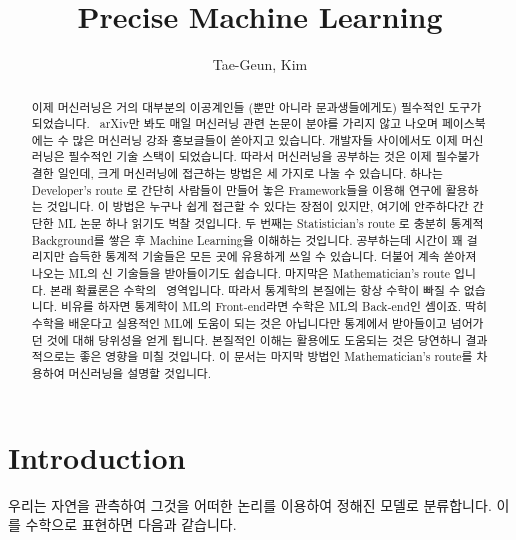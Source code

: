 \documentclass[final]{IEEEphot}
\begin{document}
\title{Precise Machine Learning}

\author{Tae-Geun, Kim}


\maketitle


\begin{abstract}
    이제 머신러닝은 거의 대부분의 이공계인들 (뿐만 아니라 문과생들에게도) 필수적인 도구가 되었습니다. 
    arXiv만 봐도 매일 머신러닝 관련 논문이 분야를 가리지 않고 나오며 페이스북에는 수 많은 머신러닝 강좌 홍보글들이 쏟아지고 있습니다. 
    개발자들 사이에서도 이제 머신러닝은 필수적인 기술 스택이 되었습니다. 따라서 머신러닝을 공부하는 것은 이제 필수불가결한 일인데, 크게 머신러닝에 접근하는 방법은 세 가지로 나눌 수 있습니다. 하나는 Developer's route 로 간단히 사람들이 만들어 놓은 Framework들을 이용해 연구에 활용하는 것입니다. 
    이 방법은 누구나 쉽게 접근할 수 있다는 장점이 있지만, 여기에 안주하다간 간단한 ML 논문 하나 읽기도 벅찰 것입니다. 
    두 번째는 Statistician's route 로 충분히 통계적 Background를 쌓은 후 Machine Learning을 이해하는 것입니다. 
    공부하는데 시간이 꽤 걸리지만 습득한 통계적 기술들은 모든 곳에 유용하게 쓰일 수 있습니다. 더불어 계속 쏟아져 나오는 ML의 신 기술들을 받아들이기도 쉽습니다. 
    마지막은 Mathematician's route 입니다. 본래 확률론은 수학의  영역입니다. 따라서 통계학의 본질에는 항상 수학이 빠질 수 없습니다. 
    비유를 하자면 통계학이 ML의 Front-end라면 수학은 ML의 Back-end인 셈이죠. 
    딱히 수학을 배운다고 실용적인 ML에 도움이 되는 것은 아닙니다만 통계에서 받아들이고 넘어가던 것에 대해 당위성을 얻게 됩니다. 
    본질적인 이해는 활용에도 도움되는 것은 당연하니 결과적으로는 좋은 영향을 미칠 것입니다. 이 문서는 마지막 방법인 Mathematician's route를 차용하여 머신러닝을 설명할 것입니다. 
\end{abstract}

\tableofcontents

\section[Introduction]{Introduction}

\HS 우리는 자연을 관측하여 그것을 어떠한 논리를 이용하여 정해진 모델로 분류합니다. 이를 수학으로 표현하면 다음과 같습니다.
\end{document}
